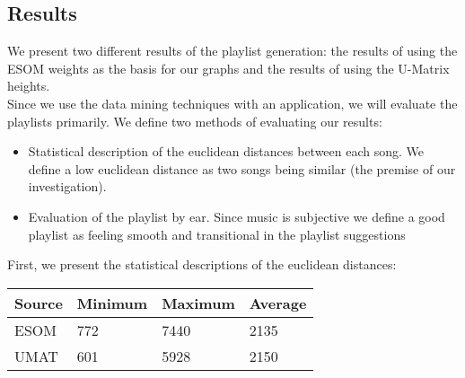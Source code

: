 \subsection{Results}

We present two different results of the playlist generation: the results of using the ESOM weights as the basis for our graphs and the results of using the U-Matrix heights.\\
Since we use the data mining techniques with an application, we will evaluate the playlists primarily. We define two methods of evaluating our results:

\begin{itemize}
\item Statistical description of the euclidean distances between each song. We define a low euclidean distance as two songs being similar (the premise of our investigation).\\
\item Evaluation of the playlist by ear. Since music is subjective we define a good playlist as feeling smooth and transitional in the playlist suggestions \\
\end{itemize}

First, we present the statistical descriptions of the euclidean distances: 

\begin{center}
    \begin{tabular}{  l | l | l | p{5cm} }
    Source & Minimum & Maximum & Average  \\ \hline
    ESOM & 772 & 7440 & 2135 \\ 
    UMAT & 601 & 5928 & 2150 \\ 
   
    \end{tabular}
\end{center}







